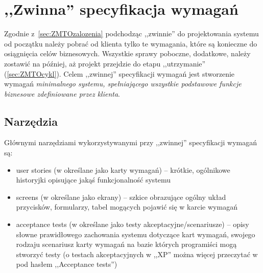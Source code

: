 \section{,,Zwinna'' specyfikacja wymagań}
\label{sec:zwinnaSpecyfikacjaWymagan}


Zgodnie z~\ref{sec:ZMTOzalozenia} podchodząc ,,zwinnie'' do projektowania systemu od początku należy pobrać od klienta tylko te wymagania, które są konieczne do osiągnięcia celów biznesowych. Wszystkie sprawy poboczne, dodatkowe, należy zostawić na później, aż projekt przejdzie do etapu ,,utrzymanie'' (\ref{sec:ZMTOcykl}). Celem ,,zwinnej'' specyfikacji wymagań jest stworzenie wymagań \emph{minimalnego systemu, spełniającego wszystkie podstawowe funkcje biznesowe zdefiniowane przez klienta}.

\subsection{Narzędzia}
\label{sec:ZSWnarzedzia}

Głównymi narzędziami wykorzystywanymi przy ,,zwinnej'' specyfikacji wymagań są:
\begin{itemize}
    \item user stories (w \cite{Mad09} określane jako karty wymagań) -- krótkie, ogólnikowe historyjki opisujące jakąś funkcjonalność systemu
    \item screens (w \cite{Mad09} określane jako ekrany) -- szkice obrazujące ogólny układ przycisków, formularzy, tabel mogących pojawić się w karcie wymagań
    \item acceptance tests (w \cite{Mad09} określane jako testy akceptacyjne/scenariusze) -- opisy słowne prawidłowego zachowania systemu dotyczące kart wymagań, swojego rodzaju scenariusz karty wymagań na bazie których programiści mogą stworzyć testy (o testach akceptacyjnych w ,,XP'' można więcej przeczytać w \cite{Jef00} pod hasłem ,,Acceptance tests'')  
\end{itemize}

